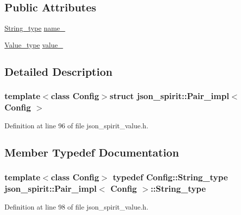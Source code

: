 \subsection*{Public Attributes}
\begin{DoxyCompactItemize}
\item 
\hyperlink{structjson__spirit_1_1_pair__impl_a76ee499775d02d1038a2b8c71621f2c8}{String\+\_\+type} \hyperlink{structjson__spirit_1_1_pair__impl_ac39e926ac119e19889bdc44958a707da}{name\+\_\+}
\item 
\hyperlink{structjson__spirit_1_1_pair__impl_aa679fec3c6ec4c76f94460d3815cf1fb}{Value\+\_\+type} \hyperlink{structjson__spirit_1_1_pair__impl_aa669eda030541a05d8736db0839925e1}{value\+\_\+}
\end{DoxyCompactItemize}


\subsection{Detailed Description}
\subsubsection*{template$<$class Config$>$struct json\+\_\+spirit\+::\+Pair\+\_\+impl$<$ Config $>$}



Definition at line 96 of file json\+\_\+spirit\+\_\+value.\+h.



\subsection{Member Typedef Documentation}
\hypertarget{structjson__spirit_1_1_pair__impl_a76ee499775d02d1038a2b8c71621f2c8}{}
\subsubsection[{String\+\_\+type}]{\setlength{\rightskip}{0pt plus 5cm}template$<$class Config$>$ typedef {\bf Config\+::\+String\+\_\+type} {\bf json\+\_\+spirit\+::\+Pair\+\_\+impl}$<$ {\bf Config} $>$\+::{\bf String\+\_\+type}}\label{structjson__spirit_1_1_pair__impl_a76ee499775d02d1038a2b8c71621f2c8}


Definition at line 98 of file json\+\_\+spirit\+\_\+value.\+h.


